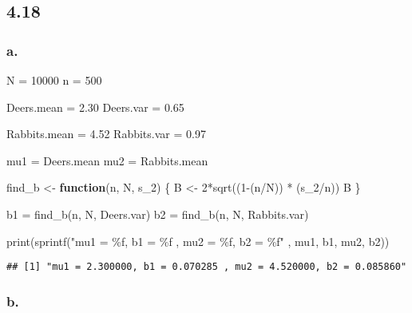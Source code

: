 \documentclass[
]{article}
\newenvironment{Shaded}{\begin{snugshade}}{\end{snugshade}}
\newcommand{\ControlFlowTok}[1]{\textcolor[rgb]{0.13,0.29,0.53}{\textbf{#1}}}
\newcommand{\DecValTok}[1]{\textcolor[rgb]{0.00,0.00,0.81}{#1}}
\newcommand{\FloatTok}[1]{\textcolor[rgb]{0.00,0.00,0.81}{#1}}
\newcommand{\FunctionTok}[1]{\textcolor[rgb]{0.00,0.00,0.00}{#1}}
\newcommand{\NormalTok}[1]{#1}
\newcommand{\OtherTok}[1]{\textcolor[rgb]{0.56,0.35,0.01}{#1}}
\newcommand{\SpecialCharTok}[1]{\textcolor[rgb]{0.00,0.00,0.00}{#1}}
\newcommand{\StringTok}[1]{\textcolor[rgb]{0.31,0.60,0.02}{#1}}
\begin{document}
\hypertarget{section-6}{%
\subsection{4.18}\label{section-6}}

\hypertarget{a.}{%
\subsubsection{a.}\label{a.}}

\begin{Shaded}
\begin{Highlighting}[]
\NormalTok{N }\OtherTok{=} \DecValTok{10000}
\NormalTok{n }\OtherTok{=} \DecValTok{500}

\NormalTok{Deers.mean }\OtherTok{=} \FloatTok{2.30}
\NormalTok{Deers.var }\OtherTok{=} \FloatTok{0.65}

\NormalTok{Rabbits.mean }\OtherTok{=} \FloatTok{4.52}
\NormalTok{Rabbits.var }\OtherTok{=} \FloatTok{0.97}

\NormalTok{mu1 }\OtherTok{=}\NormalTok{ Deers.mean}
\NormalTok{mu2 }\OtherTok{=}\NormalTok{ Rabbits.mean}

\NormalTok{find\_b }\OtherTok{\textless{}{-}} \ControlFlowTok{function}\NormalTok{(n, N, s\_2) \{}
\NormalTok{  B }\OtherTok{\textless{}{-}} \DecValTok{2}\SpecialCharTok{*}\FunctionTok{sqrt}\NormalTok{((}\DecValTok{1}\SpecialCharTok{{-}}\NormalTok{(n}\SpecialCharTok{/}\NormalTok{N)) }\SpecialCharTok{*}\NormalTok{ (s\_2}\SpecialCharTok{/}\NormalTok{n))}
\NormalTok{  B}
\NormalTok{\}}

\NormalTok{b1 }\OtherTok{=} \FunctionTok{find\_b}\NormalTok{(n, N, Deers.var)}
\NormalTok{b2 }\OtherTok{=} \FunctionTok{find\_b}\NormalTok{(n, N, Rabbits.var)}

\FunctionTok{print}\NormalTok{(}\FunctionTok{sprintf}\NormalTok{(}\StringTok{"mu1 = \%f, b1 = \%f , mu2 = \%f, b2 = \%f"}\NormalTok{ , mu1, b1, mu2, b2))}
\end{Highlighting}
\end{Shaded}

\begin{verbatim}
## [1] "mu1 = 2.300000, b1 = 0.070285 , mu2 = 4.520000, b2 = 0.085860"
\end{verbatim}

\hypertarget{b.}{%
\subsubsection{b.}\label{b.}}
\end{document}

